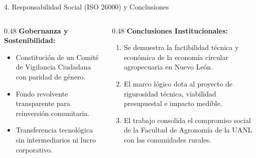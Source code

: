 \documentclass[
  spanish,
  aspectratio=169,
  xcolor={dvipsnames,table}
]{beamer}
\begin{document}
\begin{frame}{4. Responsabilidad Social (ISO 26000) y Conclusiones}
  \begin{columns}[T]
    \begin{column}{0.48\textwidth}
      \textbf{\color{uanlblue}Gobernanza y Sostenibilidad:}
      \begin{itemize}
        \item Constitución de un Comité de Vigilancia Ciudadana con paridad de género.
        \item Fondo revolvente transparente para reinversión comunitaria.
        \item Transferencia tecnológica sin intermediarios ni lucro corporativo.
      \end{itemize}
    \end{column}
    \begin{column}{0.48\textwidth}
      \textbf{\color{uanlblue}Conclusiones Institucionales:}
      \begin{enumerate}
        \item Se demuestra la factibilidad técnica y económica de la economía circular agropecuaria en Nuevo León.
        \item El marco lógico dota al proyecto de rigurosidad técnica, viabilidad presupuestal e impacto medible.
        \item El trabajo consolida el compromiso social de la Facultad de Agronomía de la UANL con las comunidades rurales.
      \end{enumerate}
    \end{column}
  \end{columns}
\end{frame}
\end{document}
